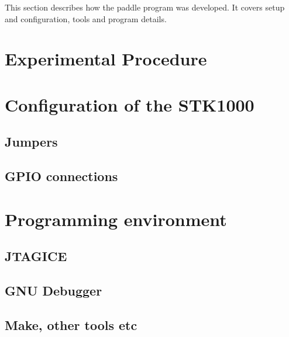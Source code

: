 This section describes how the paddle program was developed.
It covers setup and configuration, tools and program details.

\section{Experimental Procedure}
    
    

\section{Configuration of the STK1000}

    \subsection{Jumpers}

        

   \subsection{GPIO connections}

        

\section{Programming environment}

    \subsection{JTAGICE}

        

    \subsection{GNU Debugger}
        

    \subsection{Make, other tools etc}

        

